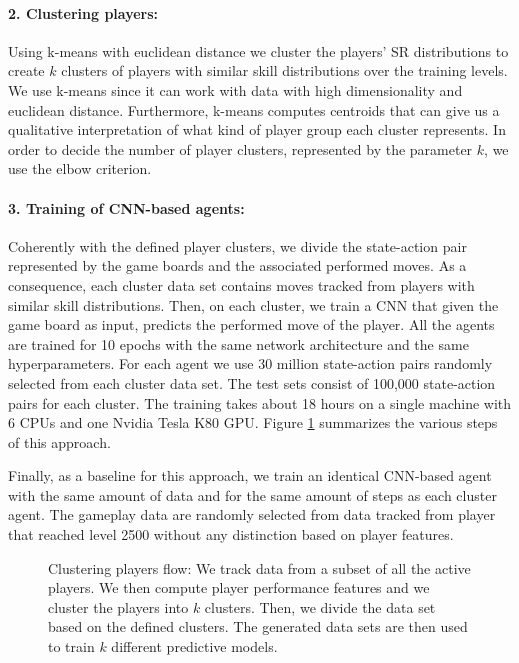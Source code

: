 \paragraph{2. Clustering players:}
Using k-means with euclidean distance we cluster the players' SR distributions to create $k$ clusters of players with similar skill distributions over the training levels. We use k-means since it can work with data with high dimensionality and euclidean distance. Furthermore, k-means computes centroids that can give us a qualitative interpretation of what kind of player group each cluster represents. In order to decide the number of player clusters, represented by the parameter $k$, we use the elbow criterion.

\paragraph{3. Training of \acs{CNN}-based agents:}
Coherently with the defined player clusters, we divide the state-action pair represented by the game boards and the associated performed moves. As a consequence, each cluster data set contains moves tracked from players with similar skill distributions. Then, on each cluster, we train a \acs{CNN} that given the game board as input, predicts the performed move of the player. All the agents are trained for 10 epochs with the same network architecture and the same hyperparameters. For each agent we use 30 million state-action pairs randomly selected from each cluster data set. The test sets consist of 100,000 state-action pairs for each cluster. The training takes about 18 hours on a single machine with 6 CPUs and one Nvidia Tesla K80 GPU. Figure \ref{fig:clustering_players_flow} summarizes the various steps of this approach. 

Finally, as a baseline for this approach, we train an identical \acs{CNN}-based agent with the same amount of data and for the same amount of steps as each cluster agent. The gameplay data are randomly selected from data tracked from player that reached level 2500 without any distinction based on player features. 

\begin{figure}[!ht]
    \centering 
    
    \caption{Clustering players flow: We track data from a subset of all the active players. We then compute player performance features and we cluster the players into $k$ clusters. Then, we divide the data set based on the defined clusters. The generated data sets are then used to train $k$ different predictive models.}
    \label{fig:clustering_players_flow}
\end{figure}




